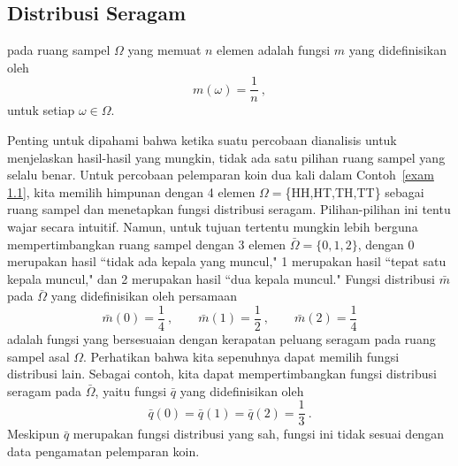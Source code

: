 \subsection*{Distribusi Seragam}

\begin{definition}\label{def 1.3} 
 pada ruang sampel $\Omega$ 
yang memuat $n$ elemen adalah fungsi $m$ yang didefinisikan oleh
$$
m(\omega) = \frac1n\ ,
$$
untuk setiap $\omega \in \Omega$.
\end{definition}
Penting untuk dipahami bahwa ketika suatu percobaan dianalisis untuk menjelaskan
hasil-hasil yang
mungkin, tidak ada satu pilihan ruang sampel yang selalu benar.  Untuk
percobaan
pelemparan koin dua kali dalam Contoh~\ref{exam 1.1},
kita memilih himpunan dengan 4 elemen $\Omega = $\{HH,HT,TH,TT\} sebagai ruang sampel
dan
menetapkan fungsi distribusi seragam.  Pilihan-pilihan ini tentu
wajar secara intuitif.  Namun, untuk tujuan tertentu mungkin lebih
berguna
mempertimbangkan ruang sampel dengan 3 elemen $\bar\Omega = \{0,1,2\}$, dengan
0
merupakan hasil ``tidak ada kepala yang muncul," 1 merupakan hasil ``tepat satu kepala
muncul," dan 2 merupakan hasil ``dua kepala muncul."  Fungsi distribusi
$\bar m$ pada $\bar\Omega$ yang didefinisikan oleh persamaan
$$
\bar m(0) = \frac14\ ,\qquad \bar m(1) = \frac12\ , \qquad \bar
m(2) =
\frac14
$$
adalah fungsi yang bersesuaian dengan kerapatan peluang seragam pada
ruang sampel asal $\Omega$.  Perhatikan bahwa kita sepenuhnya dapat memilih
fungsi distribusi lain.  Sebagai contoh, kita dapat mempertimbangkan fungsi
distribusi seragam pada $\bar\Omega$, yaitu fungsi $\bar q$
yang didefinisikan oleh
$$
\bar q(0) = \bar q(1) = \bar q(2) = \frac13\ .
$$
Meskipun $\bar q$ merupakan fungsi distribusi yang sah, fungsi ini tidak
sesuai dengan data pengamatan pelemparan koin.
